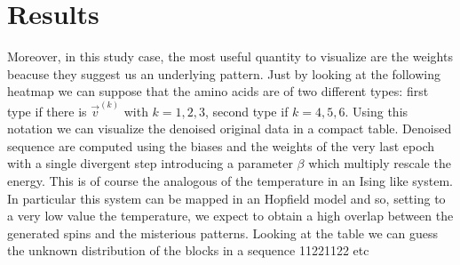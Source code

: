 \documentclass[prl, twocolumn]{revtex4-2}
\begin{document}
\section{Results}
Moreover, in this study case, the most useful quantity to visualize are the
weights beacuse they suggest us an underlying pattern. Just by looking at
the following heatmap we can suppose that the amino acids are of two
different types: first type if there is $\vec{v}^{(k)}$ with $k=1,2,3$,
second type if $k=4,5,6$. Using this notation we can visualize the denoised
original data in a compact table. Denoised sequence are computed using the
biases and the weights of the very last epoch with a single divergent step
introducing a parameter $\beta$ which multiply rescale the energy. This is
of course the analogous of the temperature in an Ising like system. In
particular this system can be mapped in an Hopfield model and so, setting
to a very low value the temperature, we expect to obtain a high overlap
between the generated spins and the misterious patterns.
Looking at the table we can guess the unknown distribution of the blocks in
a sequence 11221122 etc 


\end{document}
